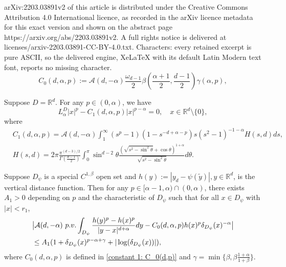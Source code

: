 \documentclass[10pt,a4paper]{amsart}
\newcommand{\ga}{\gamma}
\newcommand{\mb}{\mathbb}
\newcommand{\mc}{\mathcal}
\newcommand{\wt}{\widetilde}
\begin{document}
arXiv:2203.03891v2 of this article is distributed under the Creative Commons Attribution 4.0 International licence, as recorded in the arXiv licence metadata for this exact version and shown on the abstract page https://arxiv.org/abs/2203.03891v2. A full rights notice is delivered at licenses/arxiv-2203.03891-CC-BY-4.0.txt. Characters: every retained excerpt is pure ASCII, so the delivered engine, XeLaTeX with its default Latin Modern text font, reports no missing character.
\begin{equation}\label{constant 1: C_0(d,p)}
C_0(d,\alpha,p):= \mathcal{A}(d,-\alpha) \frac{\omega_{d-1}}{2}\beta(\frac{\alpha+1}{2},\frac{d-1}{2}) \gamma(\alpha,p), 
\end{equation}

\begin{prop} \label{harmonic: higher codimension}
Suppose $D=\mb R^d$. For any $p\in (0,\alpha)$, we have
\begin{equation} 
L^D_\alpha |x|^p- C_1(d,\alpha,p)|x|^{p-\alpha} = 0, \quad x\in \mb R^d\setminus \{0\},
\end{equation}
where 
\begin{equation}\label{constant 2: C_1(d,p)}
\begin{aligned}
& C_1(d,\alpha,p) = \mathcal{A}(d,-\alpha) \int_1^{\infty} (s^p-1)(1-s^{-d+\alpha- p})s(s^2-1)^{-1-\alpha} H(s,d)ds, \\
& H(s,d) = 2\pi \frac{\pi^{(d-3)/2}}{\Gamma(\frac{d-1}{2})} \int_0^{\pi} \sin^{d-2}\theta \frac{(\sqrt{s^2 - \sin^2 \theta} + \cos \theta)^{1+\alpha}}{\sqrt{s^2 - \sin^2 \theta}}d\theta. 
\end{aligned}
\end{equation}
\end{prop}

\begin{prop} \label{key prop: perturbation}
Suppose $D_{\psi}$ is a special $C^{1,\beta}$ open set and $h(y) := |y_d - \psi(\wt y)|, y \in \mb R^d$, is the vertical distance function. Then for any $p\in [\alpha-1,\alpha)\cap(0,\alpha)$, 
there exists $A_1>0$ depending on $p$ and the characteristic of $D_\psi$ 
such that for all $x\in D_{\psi}$ with $|x|<r_1$, 
\begin{align}\label{key-esti}
&\big|  \mc{A}(d,-\alpha){\ \rm p.v.} \int_{D_{\psi}} \frac{h(y)^p - h(x)^p}{|y-x|^{d+\alpha}}dy - C_0(d,\alpha,p)h(x)^p \delta_{D_{\psi}}(x)^{-\alpha} \big | \\
&\le  A_1(1+ \delta_{D_{\psi}}(x)^{p-\alpha+\ga} + |\log(\delta_{D_{\psi}}(x))|),\nonumber
\end{align}
where $C_0(d,\alpha,p)$ is defined in \eqref{constant 1: C_0(d,p)} and $\ga = \min\{\beta, \beta \frac{1+\alpha}{1+\beta}\}$.
\end{prop}
\end{document}

